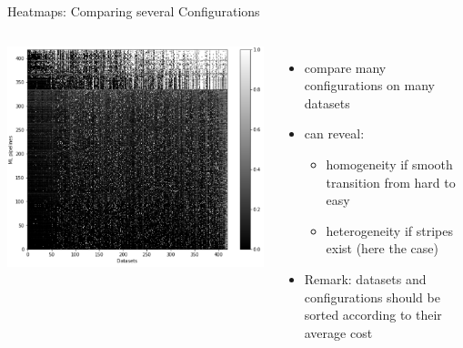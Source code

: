 \begin{frame}[c]{Heatmaps: Comparing several Configurations}

\begin{columns}
	
	\centering
	\includegraphics[width=1.0\textwidth]{images/heatmap_pipelines.png}
	
	
	\begin{itemize}
		\item compare many configurations on many datasets
		\item can reveal:
		\begin{itemize}
			\item homogeneity if smooth transition from hard to easy
			\item heterogeneity if stripes exist (here the case) 
		\end{itemize}
	    \item Remark: datasets and configurations should be sorted according to their average cost
	\end{itemize}
	
\end{columns}

\end{frame}
